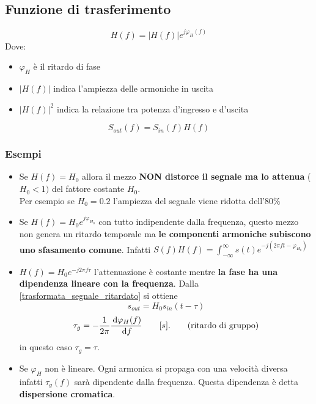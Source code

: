 \subsection{Funzione di trasferimento}
\begin{equation*}
	H(f) = |H(f)|e^{j\varphi_H(f)}
\end{equation*}
Dove:
\begin{itemize}
	\item $\varphi_H$ è il ritardo di fase
	\item $|H(f)|$ indica l'ampiezza delle armoniche in uscita
	\item $|H(f)|^2$ indica la relazione tra potenza d'ingresso e d'uscita
\end{itemize}

\begin{equation*}
	S_{out}(f) = S_{in}(f)H(f)
\end{equation*}

\subsubsection{Esempi}
\begin{itemize}
	\item Se $H(f) = H_0$ allora il mezzo \textbf{NON distorce il segnale
		ma lo attenua} ($H_0 < 1)$ del fattore costante $H_0$.\\
		Per esempio se $H_0 = 0.2$ l'ampiezza del segnale viene ridotta dell'$80\%$
	\item Se $H(f) = H_0 e^{j\varphi_{H_0}}$ con tutto indipendente dalla frequenza, questo mezzo non genera un ritardo temporale ma \textbf{le componenti armoniche subiscono uno sfasamento comune}. Infatti $S(f) H(f) = \int_{-\infty}^{\infty} s(t)e^{-j(2\pi ft - \varphi_{H_0})}$
	\item $H(f) = H_0 e^{-j2\pi f\tau}$ l'attenuazione è costante mentre \textbf{la fase ha una dipendenza lineare con la frequenza}. Dalla \eqref{trasformata_segnale_ritardato} si ottiene
		\begin{equation}
			s_{out} = H_0 s_{in}(t-\tau)
		\end{equation}
		\begin{equation}
			\tau_g = -\frac{1}{2\pi} \frac{\,\mathrm{d} \varphi_H(f)}{\,\mathrm{d} f} \qquad [s]. \tag{ritardo di gruppo}
		\end{equation}
		in questo caso $\tau_g = \tau$.
	\item Se $\varphi_H$ non è lineare. Ogni armonica si propaga con una velocità diversa infatti $\tau_g(f)$ sarà dipendente dalla frequenza. Questa dipendenza è detta \textbf{dispersione cromatica}.
\end{itemize}
